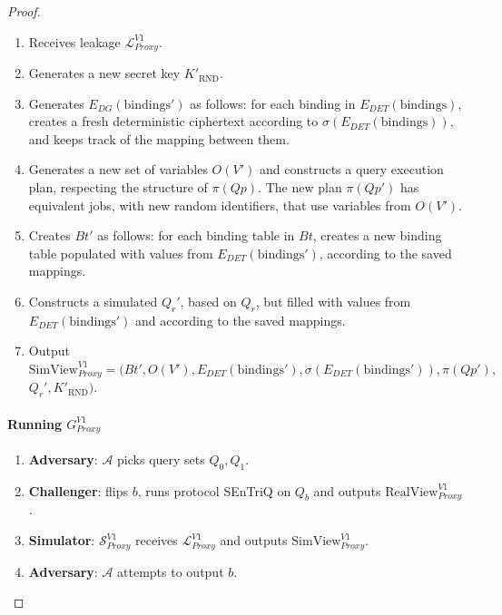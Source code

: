 \begin{proof}
    \begin{enumerate}
        \item Receives leakage $\mathcal{L}_{Proxy}^{V1}$.
        \item Generates a new secret key $K'_{\text{RND}}$.
        \item Generates $E_{DG}(\mathrm{bindings'})$ as follows: for each binding in $E_{DET}(\mathrm{bindings})$, creates a fresh deterministic ciphertext according to $\sigma(E_{DET}(\mathrm{bindings}))$, and keeps track of the mapping between them.
        \item Generates a new set of variables $O(V')$ and constructs a query execution plan, respecting the structure of $\pi(Qp)$. The new plan $\pi(Qp')$ has equivalent jobs, with new random identifiers, that use variables from $O(V')$.
        \item Creates $Bt'$ as follows: for each binding table in $Bt$, creates a new binding table populated with values from $E_{DET}(\mathrm{bindings'})$, according to the saved mappings.
        \item Constructs a simulated $Q_r'$, based on $Q_r$, but filled with values from $E_{DET}(\mathrm{bindings'})$ and according to the saved mappings.
        \item Output $\mathrm{SimView}_{Proxy}^{V1} = (Bt', O(V'), E_{DET}(\mathrm{bindings'}), \sigma(E_{DET}(\mathrm{bindings'})), \pi(Qp'),$\linebreak$ Q_r', K'_{\text{RND}})$.
    \end{enumerate}

    \paragraph{Running $G^{V1}_{Proxy}$}

    \begin{enumerate}
        \item \textbf{Adversary}: $\mathcal{A}$ picks query sets $Q_0, Q_1$.
        \item \textbf{Challenger}: flips $b$, runs protocol \gls{SEnTriQ} on $Q_b$ and outputs \linebreak$\mathrm{RealView}^{V1}_{Proxy}$.
        \item \textbf{Simulator}: $\mathcal{S}_{Proxy}^{V1}$ receives $\mathcal{L}_{Proxy}^{V1}$ and outputs $\mathrm{SimView}_{Proxy}^{V1}$.
        \item \textbf{Adversary}: $\mathcal{A}$ attempts to output $b$. 
    \end{enumerate}


\end{proof}
